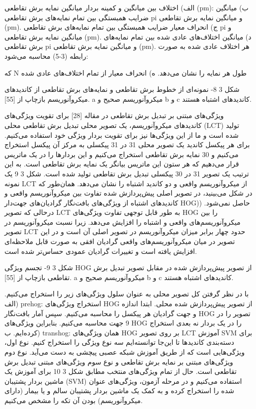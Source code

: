 الف) اختلاف بین میانگین و کمینه بردار میانگین نمایه برش تقاطعی (pm):
ب) میانگین ضرایب همبستگی بین تمام نمایه‌های برش تقاطعی pi و میانگین نمایه برش تقاطعی (pm).
	ج) انحراف معیار ضرایب همبستگی بین تمام نمایه‌های برش تقاطعی pi و میانگین نمایه برش تقاطعی (pm).
	د) میانگین اختلاف‌های عادی‌ شده  بین تمام نمایه‌های برش تقاطعی pi و میانگین نمایه برش تقاطعی (pm). 	هر اختلاف عادی شده به صورت رابطه (3-5) محاسبه می‌شود:

که N طول هر نمایه را نشان می‌دهد.
	ه) انحراف معیار از تمام اختلاف‌های عادی شده


 
شکل ‏3 8- نمونه‌ای از خطوط برش تقاطعی و نمایه‌های برش تقاطعی از کاندید‌های میکروآنوریسم بازچاپ از [55]. a میکروآنوریسم صحیح و b و c کاندید‌های اشتباه هستند.

	ویژگی‌های مبتنی بر تبدیل برش تقاطعی
در مقاله [28] برای تقویت ویژگی‌های کاندیدهای میکروآنوریسم، یک تصویر محلی تبدیل برش تقاطعی محلی (LCT)  تولید شده است و ما از این ویژگی‌ها نیز برای تقویت بردار ویژگی خود استفاده می‌کنیم.
برای هر پیکسل کاندید یک تصویر محلی 31 در 31 پیکسلی به مرکز آن پیکسل استخراج می‌کنیم و 30 نمایه برش تقاطعی استخراج می‌کنیم و این بردارها را در یک ماتریس قرار می‌دهیم که هر ستون این ماتریس بیانگر یک نمایه برش تقاطعی است. به این ترتیب یک تصویر 31 در 30 پیکسلی تبدیل برش تقاطعی تولید شده است. شکل ‏3 9 یک نمونه LCT از میکروآنوریسم واقعی و دو کاندید اشتباه را نشان می‌دهد. همان‌طور که در شکل می‌بینید، در تصویر اصلی پیش‌پردازش شده تفاوت بین میکروآنوریسم واقعی و کاندیدهای اشتباه از ویژگی‌های بافت‌نگار گرادیان‌های جهت‌دار  HOG)) حاصل نمی‌شود. درحالی که تصویر LCT به طور قابل توجهی تفاوت ویژگی‌های HOG را بین میکروآنوریسم‌های واقعی و اشتباه را افزایش می‌دهد. زیرا نسبت میکروآنوریسم در تصویر LCT حدود چهار برابر میزان میکروآنوریسم در تصویر اصلی آن است و در این تصویر در میان میکروآنوریسم‌های واقعی گرادیان افقی به صورت قابل ملاحظه‌ای افزایش یافته است و تغییرات گرادیان عمودی حساس‌تر شده است.
 
شکل ‏3 9- تجسم ویژگی HOG  از تصویر پیش‌پردازش شده در مقابل تصویر تبدیل برش تقاطعی بازچاپ از [55]. a میکروآنوریسم صحیح و b و c کاندیدهای اشتباه هستند.

با در نظر گرفتن کل تصویر محلی به عنوان سلول ویژگی‌های زیر را استخراج می‌کنیم.
الف) prehog: استخراج ویژگی‌های HOG از تصویر پیش‌پردازش شده محلی. ابتدا اندازه و جهت گرادیان هر پیکسل را محاسبه می‌کنیم. سپس آمار بافت‌نگار HOG تصویر را در 9 جهت محاسبه می‌کنیم. بنابراین ویژگی‌های HOG را در یک بردار نه بعدی استخراج کرده‌ایم.
ب) transhog: همان ویژگی‌های HOG بر روی تصویر LCT
	آموزش SVM برای دسته‌بندی کاندیدها
تا این‌جا توانسته‌ایم سه نوع ویژگی را استخراج کنیم. نوع اول، ویژگی‌هایی است که از طریق آموزش شبکه عصبی پیچشی به دست می‌آید. نوع دوم ویژگی‌های مبتنی بر نمایه برش تقاطعی و نوع سوم ویژگی‌های مبتنی تبدیل برش تقاطعی است. حال از تمام ویژگی‌های منتخب مطابق شکل ‏3 10 برای آموزش یک ماشین بردار پشتیبان (SVM) استفاده می‌کنیم و در مرحله آزمون، ویژگی‌های عنوان شده را استخراج کرده و به کمک یک ماشین بردار پشتیبان سالم و یا بیمار (دارای میکروآنوریسم) بودن آن تکه را مشخص می‌کنیم. 



